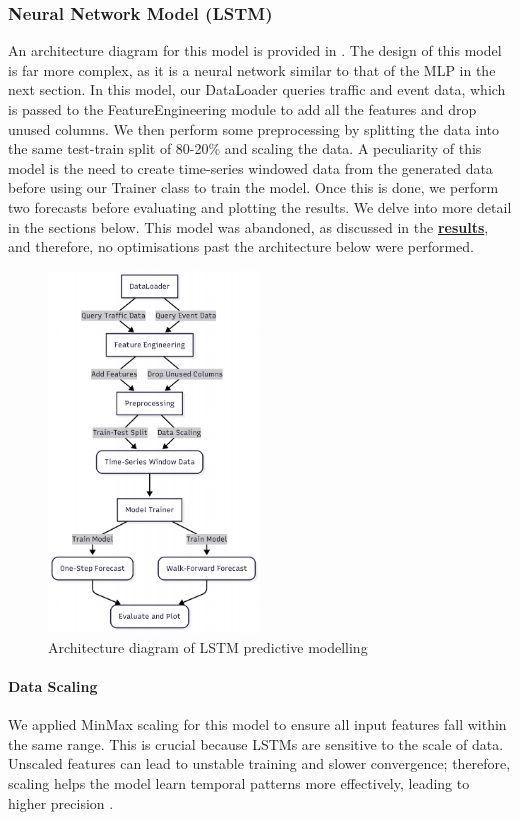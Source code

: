 \subsubsection{Neural Network Model (LSTM)}
An architecture diagram for this model is provided in . The design of this model is far more complex, as it is a neural network similar to that of the MLP in the next section. In this model, our DataLoader queries traffic and event data, which is passed to the FeatureEngineering module to add all the features and drop unused columns. We then perform some preprocessing by splitting the data into the same test-train split of 80-20\% and scaling the data. A peculiarity of this model is the need to create time-series windowed data from the generated data before using our Trainer class to train the model. Once this is done, we perform two forecasts before evaluating and plotting the results. We delve into more detail in the sections below. This model was abandoned, as discussed in the \textbf{\hyperref[link:lstm-results]{results}}, and therefore, no optimisations past the architecture below were performed.

\begin{figure}[!ht]
  \centering
  \includegraphics[width=0.5\textwidth]{images/design-implementation/lstm.pdf}
  \caption{Architecture diagram of LSTM predictive modelling}
  \label{fig:lstm-arch}
\end{figure}

\paragraph{Data Scaling}
\label{link:data-scaling}
We applied MinMax scaling for this model to ensure all input features fall within the same range. This is crucial because LSTMs are sensitive to the scale of data. Unscaled features can lead to unstable training and slower convergence; therefore, scaling helps the model learn temporal patterns more effectively, leading to higher precision \cite{sharma_study_2022}.

